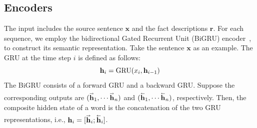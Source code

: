 \documentclass[letterpaper]{article} %
\begin{document}
	\subsection{Encoders}
	The input includes the source sentence $\mathbf{x}$ and the fact descriptions $\mathbf{r}$.
	For each sequence, we employ the bidirectional Gated Recurrent Unit (BiGRU) encoder~\cite{cho2014learning}, to construct its semantic representation.
	Take the sentence $\mathbf{x}$ as an example.
	The GRU at the time step $i$ is defined as follows:
	\begin{equation}\label{eq:GRU}
		{{\bf{h}}_i} = {\text{GRU}}({x_i},{{\bf{h}}_{i - 1}})
	\end{equation}
	The BiGRU consists of a forward GRU and a backward GRU. 
	Suppose the corresponding outputs are $({{\mathbf{\overset{\lower0.5em\hbox{$\smash{\scriptscriptstyle\rightarrow}$}}{h} }}_1}, \cdots {{\mathbf{\overset{\lower0.5em\hbox{$\smash{\scriptscriptstyle\rightarrow}$}}{h} }}_n})$ and $({{\mathbf{\overset{\lower0.5em\hbox{$\smash{\scriptscriptstyle\leftarrow}$}}{h} }}_1}, \cdots {{\mathbf{\overset{\lower0.5em\hbox{$\smash{\scriptscriptstyle\leftarrow}$}}{h} }}_n})$, respectively.
	Then, the composite hidden state of a word is the concatenation of the two GRU representations, i.e., ${{\mathbf{h}}_i} = [{{\mathbf{\overset{\lower0.5em\hbox{$\smash{\scriptscriptstyle\rightarrow}$}}{h} }}_i};{{\mathbf{\overset{\lower0.5em\hbox{$\smash{\scriptscriptstyle\leftarrow}$}}{h} }}_i}]$.
	
\end{document}
